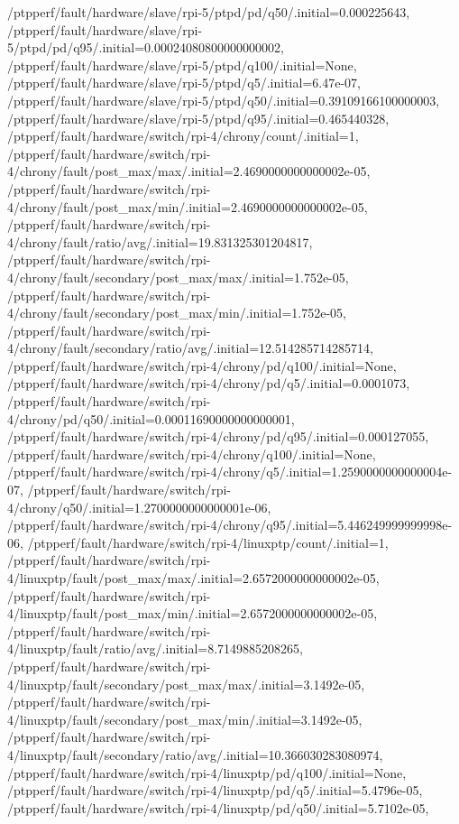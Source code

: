 {    /ptpperf/fault/hardware/slave/rpi-5/ptpd/pd/q50/.initial=0.000225643,
    /ptpperf/fault/hardware/slave/rpi-5/ptpd/pd/q95/.initial=0.00024080800000000002,
    /ptpperf/fault/hardware/slave/rpi-5/ptpd/q100/.initial=None,
    /ptpperf/fault/hardware/slave/rpi-5/ptpd/q5/.initial=6.47e-07,
    /ptpperf/fault/hardware/slave/rpi-5/ptpd/q50/.initial=0.39109166100000003,
    /ptpperf/fault/hardware/slave/rpi-5/ptpd/q95/.initial=0.465440328,
    /ptpperf/fault/hardware/switch/rpi-4/chrony/count/.initial=1,
    /ptpperf/fault/hardware/switch/rpi-4/chrony/fault/post_max/max/.initial=2.4690000000000002e-05,
    /ptpperf/fault/hardware/switch/rpi-4/chrony/fault/post_max/min/.initial=2.4690000000000002e-05,
    /ptpperf/fault/hardware/switch/rpi-4/chrony/fault/ratio/avg/.initial=19.831325301204817,
    /ptpperf/fault/hardware/switch/rpi-4/chrony/fault/secondary/post_max/max/.initial=1.752e-05,
    /ptpperf/fault/hardware/switch/rpi-4/chrony/fault/secondary/post_max/min/.initial=1.752e-05,
    /ptpperf/fault/hardware/switch/rpi-4/chrony/fault/secondary/ratio/avg/.initial=12.514285714285714,
    /ptpperf/fault/hardware/switch/rpi-4/chrony/pd/q100/.initial=None,
    /ptpperf/fault/hardware/switch/rpi-4/chrony/pd/q5/.initial=0.0001073,
    /ptpperf/fault/hardware/switch/rpi-4/chrony/pd/q50/.initial=0.00011690000000000001,
    /ptpperf/fault/hardware/switch/rpi-4/chrony/pd/q95/.initial=0.000127055,
    /ptpperf/fault/hardware/switch/rpi-4/chrony/q100/.initial=None,
    /ptpperf/fault/hardware/switch/rpi-4/chrony/q5/.initial=1.2590000000000004e-07,
    /ptpperf/fault/hardware/switch/rpi-4/chrony/q50/.initial=1.2700000000000001e-06,
    /ptpperf/fault/hardware/switch/rpi-4/chrony/q95/.initial=5.446249999999998e-06,
    /ptpperf/fault/hardware/switch/rpi-4/linuxptp/count/.initial=1,
    /ptpperf/fault/hardware/switch/rpi-4/linuxptp/fault/post_max/max/.initial=2.6572000000000002e-05,
    /ptpperf/fault/hardware/switch/rpi-4/linuxptp/fault/post_max/min/.initial=2.6572000000000002e-05,
    /ptpperf/fault/hardware/switch/rpi-4/linuxptp/fault/ratio/avg/.initial=8.7149885208265,
    /ptpperf/fault/hardware/switch/rpi-4/linuxptp/fault/secondary/post_max/max/.initial=3.1492e-05,
    /ptpperf/fault/hardware/switch/rpi-4/linuxptp/fault/secondary/post_max/min/.initial=3.1492e-05,
    /ptpperf/fault/hardware/switch/rpi-4/linuxptp/fault/secondary/ratio/avg/.initial=10.366030283080974,
    /ptpperf/fault/hardware/switch/rpi-4/linuxptp/pd/q100/.initial=None,
    /ptpperf/fault/hardware/switch/rpi-4/linuxptp/pd/q5/.initial=5.4796e-05,
    /ptpperf/fault/hardware/switch/rpi-4/linuxptp/pd/q50/.initial=5.7102e-05,
}
